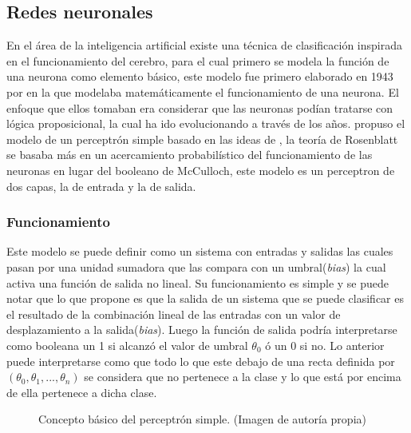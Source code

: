 \subsection{Redes neuronales}

\par En el área de la inteligencia artificial existe una técnica de clasificación inspirada en el funcionamiento del cerebro, para el cual primero se modela la función de una neurona como elemento básico, este modelo fue primero elaborado en 1943 por \cite{mcculloch1943logical} en la que modelaba matemáticamente el funcionamiento de una neurona. El enfoque que ellos tomaban era considerar que las neuronas podían tratarse con lógica proposicional, la cual ha ido evolucionando a través de los años.  \cite{rosenblatt1958perceptron} propuso el modelo de un perceptrón simple basado en las ideas de \cite{mcculloch1943logical}, la teoría de Rosenblatt se basaba más en un acercamiento probabilístico del funcionamiento de las neuronas en lugar del booleano de McCulloch, este modelo es un perceptron de dos capas, la de entrada y la de salida. 
		    
\subsubsection{Funcionamiento}
		    
\par Este modelo se puede definir como un sistema con entradas y salidas las cuales pasan por una unidad sumadora que las compara con un umbral(\textit{bias}) la cual activa una función de salida no lineal. Su funcionamiento es simple y se puede notar que lo que propone es que la salida de un sistema que se puede clasificar es el resultado de la combinación lineal de las entradas con un valor de desplazamiento a la salida(\textit{bias}). Luego la función de salida podría interpretarse como booleana un 1 si alcanzó el valor de umbral $\theta_{0}$ ó un 0 si no. Lo anterior puede interpretarse como que todo lo que este debajo de una recta definida por $(\theta_0,\theta_1,...,\theta_n)$ se considera que no pertenece a la clase y lo que está por encima de ella pertenece a dicha clase.
\begin{figure}[H]
	\centering
	
	\caption{Concepto básico del perceptrón simple. (Imagen de autoría propia)}
	\label{fig:perceptron}
\end{figure}
		    
